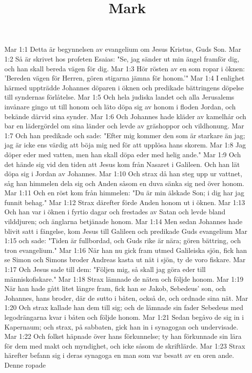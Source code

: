 

\title{Mark}

Mar 1:1  Detta är begynnelsen av evangelium om Jesus Kristus, Guds Son.
Mar 1:2  Så är skrivet hos profeten Esaias: "Se, jag sänder ut min ängel framför dig, och han skall bereda vägen för dig.
Mar 1:3  Hör rösten av en som ropar i öknen: 'Bereden vägen för Herren, gören stigarna jämna för honom.'"
Mar 1:4  I enlighet härmed uppträdde Johannes döparen i öknen och predikade bättringens döpelse till syndernas förlåtelse.
Mar 1:5  Och hela judiska landet och alla Jerusalems invånare gingo ut till honom och läto döpa sig av honom i floden Jordan, och bekände därvid sina synder.
Mar 1:6  Och Johannes hade kläder av kamelhår och bar en lädergördel om sina länder och levde av gräshoppor och vildhonung.
Mar 1:7  Och han predikade och sade: "Efter mig kommer den som är starkare än jag; jag är icke ens värdig att böja mig ned för att upplösa hans skorem.
Mar 1:8  Jag döper eder med vatten, men han skall döpa eder med helig ande."
Mar 1:9  Och det hände sig vid den tiden att Jesus kom från Nasaret i Galileen. Och han lät döpa sig i Jordan av Johannes.
Mar 1:10  Och strax då han steg upp ur vattnet, såg han himmelen dela sig och Anden såsom en duva sänka sig ned över honom.
Mar 1:11  Och en röst kom från himmelen: "Du är min älskade Son; i dig har jag funnit behag."
Mar 1:12  Strax därefter förde Anden honom ut i öknen.
Mar 1:13  Och han var i öknen i fyrtio dagar och frestades av Satan och levde bland vilddjuren; och änglarna betjänade honom.
Mar 1:14  Men sedan Johannes hade blivit satt i fängelse, kom Jesus till Galileen och predikade Guds evangelium
Mar 1:15  och sade: "Tiden är fullbordad, och Guds rike är nära; gören bättring, och tron evangelium."
Mar 1:16  När han nu gick fram utmed Galileiska sjön, fick han se Simon och Simons broder Andreas kasta ut nät i sjön, ty de voro fiskare.
Mar 1:17  Och Jesus sade till dem: "Följen mig, så skall jag göra eder till människofiskare."
Mar 1:18  Strax lämnade de näten och följde honom.
Mar 1:19  När han hade gått litet längre fram, fick han se Jakob, Sebedeus' son, och Johannes, hans broder, där de sutto i båten, också de, och ordnade sina nät.
Mar 1:20  Och strax kallade han dem till sig; och de lämnade sin fader Sebedeus med legodrängarna kvar i båten och följde honom.
Mar 1:21  Sedan begåvo de sig in i Kapernaum; och strax, på sabbaten, gick han in i synagogan och undervisade.
Mar 1:22  Och folket häpnade över hans förkunnelse; ty han förkunnade sin lära för dem med makt och myndighet, och icke såsom de skriftlärde.
Mar 1:23  Strax härefter befann sig i deras synagoga en man som var besatt av en oren ande. Denne ropade
